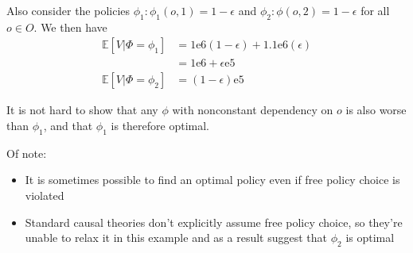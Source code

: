 Also consider the policies $\phi_1:\phi_1(o,1)=1-\epsilon$ and $\phi_2:\phi(o,2)=1-\epsilon$ for all $o\in O$. We then have
\begin{align}
    \mathbb{E}[V|\Phi=\phi_1] &= 1\mathrm{e}6 (1-\epsilon) + 1.1\mathrm{e}6 (\epsilon) \\
                              &= 1\mathrm{e}6 + \epsilon \mathrm{e} 5 \\
    \mathbb{E}[V|\Phi=\phi_2] &= (1-\epsilon)\mathrm{e}5
\end{align}

It is not hard to show that any $\phi$ with nonconstant dependency on $o$ is also worse than $\phi_1$, and that $\phi_1$ is therefore optimal.

Of note:
\begin{itemize}
    \item It is sometimes possible to find an optimal policy even if free policy choice is violated
    \item Standard causal theories don't explicitly assume free policy choice, so they're unable to relax it in this example and as a result suggest that $\phi_2$ is optimal
\end{itemize}





